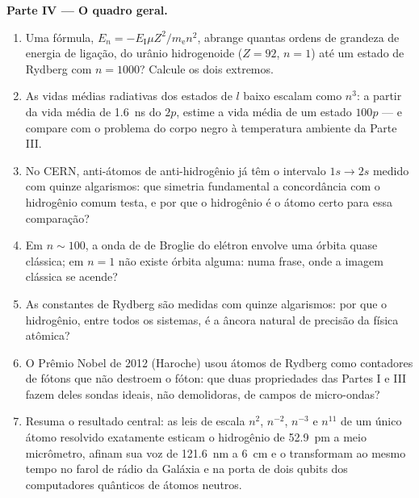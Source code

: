 \begin{problem}
\medskip\noindent\textbf{Parte IV --- O quadro geral.}
\begin{enumerate}[resume]
  \item Uma fórmula, $E_n = -E_{\text{I}}\mu Z^2/m_{\text{e}}n^2$,
        abrange quantas ordens de grandeza de energia de ligação, do
        urânio hidrogenoide ($Z = 92$, $n = 1$) até um estado de
        Rydberg com $n = 1000$? Calcule os dois extremos.
  \item As vidas médias radiativas dos estados de $l$ baixo escalam
        como $n^3$: a partir da vida média de \qty{1.6}{ns} do $2p$,
        estime a vida média de um estado $100p$ --- e compare com o
        problema do corpo negro à temperatura ambiente da Parte III.
  \item No CERN, anti-átomos de anti-hidrogênio já têm o intervalo
        $1s \to 2s$ medido com quinze algarismos: que simetria
        fundamental a concordância com o hidrogênio comum testa, e por
        que o hidrogênio é o átomo certo para essa comparação?
  \item Em $n \sim 100$, a onda de de Broglie do elétron envolve uma
        órbita quase clássica; em $n = 1$ não existe órbita alguma:
        numa frase, onde a imagem clássica se acende?
  \item As constantes de Rydberg são medidas com quinze algarismos:
        por que o hidrogênio, entre todos os sistemas, é a âncora
        natural de precisão da física atômica?
  \item O Prêmio Nobel de 2012 (Haroche) usou átomos de Rydberg como
        contadores de fótons que não destroem o fóton: que duas
        propriedades das Partes I e III fazem deles sondas ideais, não
        demolidoras, de campos de micro-ondas?
  \item Resuma o resultado central: as leis de escala $n^2$, $n^{-2}$,
        $n^{-3}$ e $n^{11}$ de um único átomo resolvido exatamente
        esticam o hidrogênio de \qty{52.9}{pm} a meio micrômetro,
        afinam sua voz de \qty{121.6}{nm} a \qty{6}{cm} e o
        transformam ao mesmo tempo no farol de rádio da Galáxia e na
        porta de dois qubits dos computadores quânticos de átomos
        neutros.
\end{enumerate}
\end{problem}
